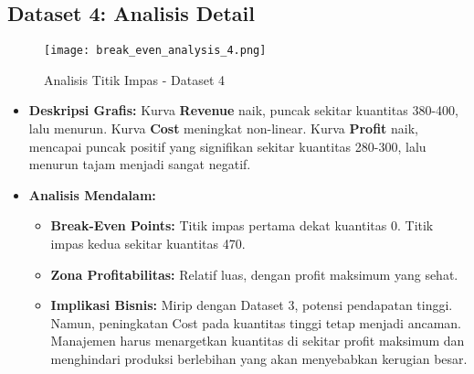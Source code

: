 \documentclass[conference]{IEEEtran}
\begin{document}
\subsection*{Dataset 4: Analisis Detail}
\begin{figure}[H]
    \centering
    \texttt{[image: break\_even\_analysis\_4.png]}
    \caption{Analisis Titik Impas - Dataset 4}
    \label{fig:dataset4_new}
\end{figure}
\begin{itemize}
    \item \textbf{Deskripsi Grafis:} Kurva \textbf{Revenue} naik, puncak sekitar kuantitas 380-400, lalu menurun. Kurva \textbf{Cost} meningkat non-linear. Kurva \textbf{Profit} naik, mencapai puncak positif yang signifikan sekitar kuantitas 280-300, lalu menurun tajam menjadi sangat negatif.
    \item \textbf{Analisis Mendalam:}
    \begin{itemize}
        \item \textbf{Break-Even Points:} Titik impas pertama dekat kuantitas 0. Titik impas kedua sekitar kuantitas 470.
        \item \textbf{Zona Profitabilitas:} Relatif luas, dengan profit maksimum yang sehat.
        \item \textbf{Implikasi Bisnis:} Mirip dengan Dataset 3, potensi pendapatan tinggi. Namun, peningkatan Cost pada kuantitas tinggi tetap menjadi ancaman. Manajemen harus menargetkan kuantitas di sekitar profit maksimum dan menghindari produksi berlebihan yang akan menyebabkan kerugian besar.
    \end{itemize}
\end{itemize}
\end{document}

